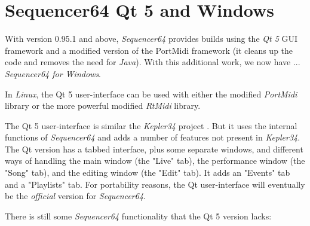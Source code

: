 %
%
%
%

\section{Sequencer64 Qt 5 and Windows}
\label{sec:qt_portmidi}

   With version 0.95.1 and above,
   \textsl{Sequencer64} provides builds using
   the \textsl{Qt 5} GUI framework and a modified version of the
   PortMidi framework (it cleans up the code and removes the need for
   \textsl{Java}).
   With this additional work, we now have ...
   \textsl{Sequencer64 for Windows}.

   In \textsl{Linux}, the Qt 5 user-interface can be used with either the
   modified \textsl{PortMidi} library or the more powerful modified
   \textsl{RtMidi} library.

   The Qt 5 user-interface is similar
   the \textsl{Kepler34} project \cite{kepler34}.
   But it uses the internal functions of \textsl{Sequencer64} and adds a
   number of features not present in \textsl{Kepler34}.
   The Qt version has a tabbed interface, plus some separate windows,
   and different ways of handling the main
   window (the "Live" tab), the performance window (the "Song" tab), and the
   editing window (the "Edit" tab).
   It adds an "Events" tab and a "Playlists" tab.
   For portability reasons, the Qt user-interface will eventually be the
   \textsl{official} version for \textsl{Sequencer64}.

   There is still some \textsl{Sequencer64} functionality that
   the Qt 5 version lacks:

